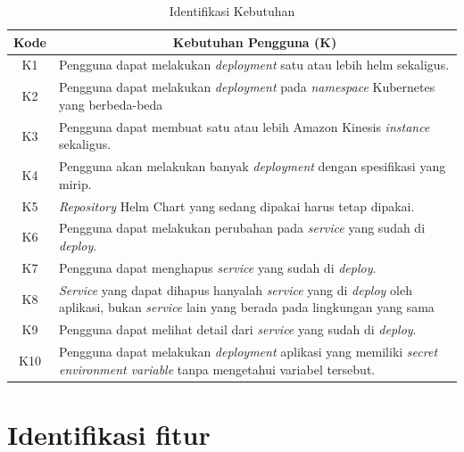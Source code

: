 \begin{table}
    \centering
    \begin{tabular}{|c|p{12cm}|}
        \hline
        \multicolumn{1}{|c|}{Kode} & \multicolumn{1}{c|}{\textbf{Kebutuhan Pengguna (K)}} \\
        \hline
        K1 & Pengguna dapat melakukan \textit{deployment} satu atau lebih helm sekaligus. \\
        \hline
        K2 & Pengguna dapat melakukan \textit{deployment} pada \textit{namespace} Kubernetes yang berbeda-beda \\
        \hline
        K3 & Pengguna dapat membuat satu atau lebih Amazon Kinesis \textit{instance} sekaligus. \\
        \hline
        K4 & Pengguna akan melakukan banyak \textit{deployment} dengan spesifikasi yang mirip. \\
        \hline
        K5 & \textit{Repository} Helm Chart yang sedang dipakai harus tetap dipakai. \\
        \hline
        K6 & Pengguna dapat melakukan perubahan pada \textit{service} yang sudah di \textit{deploy}. \\
        \hline
        K7 & Pengguna dapat menghapus \textit{service} yang sudah di \textit{deploy}. \\
        \hline
        K8 & \textit{Service} yang dapat dihapus hanyalah \textit{service} yang di \textit{deploy} oleh aplikasi, bukan \textit{service} lain yang berada pada lingkungan yang sama \\
        \hline
        K9 & Pengguna dapat melihat detail dari \textit{service} yang sudah di \textit{deploy}. \\
        \hline
        K10 & Pengguna dapat melakukan \textit{deployment} aplikasi yang memiliki \textit{secret environment variable} tanpa mengetahui variabel tersebut. \\
        \hline
    \end{tabular}
    \caption{Identifikasi Kebutuhan}
    \label{tab:analisisKebutuhanPengguna}
\end{table}

\section{Identifikasi fitur}
\label{sec:identifikasiFitur}

